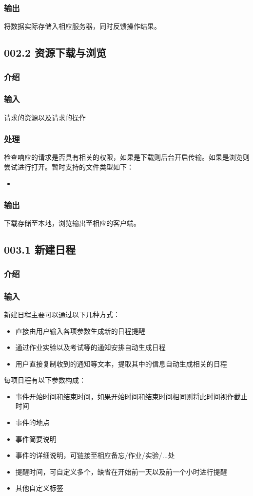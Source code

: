     \subsubsection{输出}
    将数据实际存储入相应服务器，同时反馈操作结果。

  \subsection{002.2 资源下载与浏览}
    \subsubsection{介绍}

    \subsubsection{输入}
    请求的资源以及请求的操作
    \subsubsection{处理}
    检查响应的请求是否具有相关的权限，如果是下载则后台开启传输。如果是浏览则尝试进行打开。暂时支持的文件类型如下：
    \begin{itemize}
      \item
    \end{itemize}
    \subsubsection{输出}
    下载存储至本地，浏览输出至相应的客户端。

  \subsection{003.1 新建日程}
    \subsubsection{介绍}

    \subsubsection{输入}
    新建日程主要可以通过以下几种方式：
    \begin{itemize}
      \item 直接由用户输入各项参数生成新的日程提醒
      \item 通过作业实验以及考试等的通知安排自动生成日程
      \item 用户直接复制收到的通知等文本，提取其中的信息自动生成相关的日程
    \end{itemize}
    每项日程有以下参数构成：
    \begin{itemize}
      \item 事件开始时间和结束时间，如果开始时间和结束时间相同则将此时间视作截止时间
      \item 事件的地点
      \item 事件简要说明
      \item 事件的详细说明，可链接至相应备忘/作业/实验/...处
      \item 提醒时间，可自定义多个，缺省在开始前一天以及前一个小时进行提醒
      \item 其他自定义标签
    \end{itemize}
